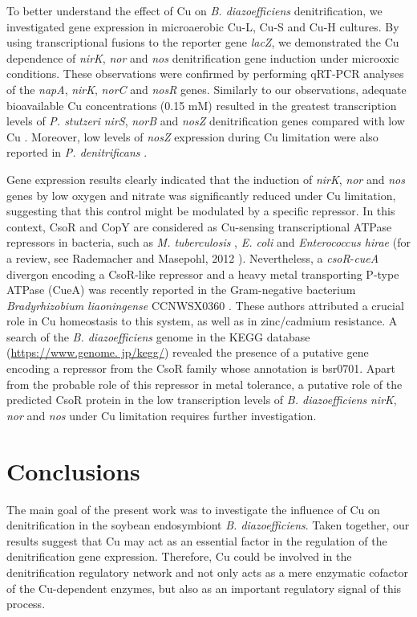 \documentclass[a4paper,11pt]{article}
\begin{document}
To better understand the effect of Cu on {\em B. diazoefficiens} denitrification, we investigated
gene expression in microaerobic Cu-L, Cu-S and Cu-H cultures. By using transcriptional fusions to the reporter gene {\em lacZ}, we demonstrated the Cu dependence of {\em nirK}, {\em nor} and {\em nos} denitrification
gene induction under microoxic conditions. These observations were confirmed by
performing qRT-PCR analyses of the {\em napA}, {\em nirK}, {\em norC} and {\em nosR} genes. Similarly to our
observations, adequate bioavailable Cu concentrations (0.15 mM) resulted in the greatest
transcription levels of {\em P. stutzeri} {\em nirS}, {\em norB} and {\em nosZ} denitrification genes compared with
low Cu \cite{black2016influence}. Moreover, low levels of {\em nosZ} expression during Cu limitation were also
reported in {\em P. denitrificans} \cite{sullivan2013copper}.

Gene expression results clearly indicated that the induction of {\em nirK}, {\em nor} and {\em nos} genes
by low oxygen and nitrate was significantly reduced under Cu limitation, suggesting
that this control might be modulated by a specific repressor. In this context, CsoR and
CopY are considered as Cu-sensing transcriptional ATPase repressors in bacteria, such
as {\em M. tuberculosis} \cite{liu2007csor}, {\em E. coli} and {\em Enterococcus hirae} (for a review, see Rademacher and
Masepohl, 2012 \cite{rademacher2012copper}). Nevertheless, a {\em csoR}-{\em cueA} divergon encoding a CsoR-like repressor
and a heavy metal transporting P-type ATPase (CueA) was recently reported in the
Gram-negative bacterium {\em Bradyrhizobium liaoningense} CCNWSX0360 \cite{liu2007csor}. These authors
attributed a crucial role in Cu homeostasis to this system, as well as in zinc/cadmium resistance.
A search of the {\em B. diazoefficiens} genome in the KEGG database (\url{https://www.genome.
jp/kegg/}) revealed the presence of a putative gene encoding a
repressor from the CsoR family whose annotation is bsr0701. Apart from the probable role
of this repressor in metal tolerance, a putative role of the predicted CsoR protein in the
low transcription levels of {\em B. diazoefficiens} {\em nirK}, {\em nor} and {\em nos} under Cu limitation requires
further investigation.

\section{Conclusions}
The main goal of the present work was to investigate the influence of Cu on denitrification
in the soybean endosymbiont {\em B. diazoefficiens}. Taken together, our results suggest that
Cu may
act as an essential factor in the regulation of the denitrification gene expression. Therefore, Cu could be involved in the denitrification regulatory network and
not only acts as a mere enzymatic cofactor of the Cu-dependent enzymes, but also as an
important regulatory signal of this process.



\end{document}
